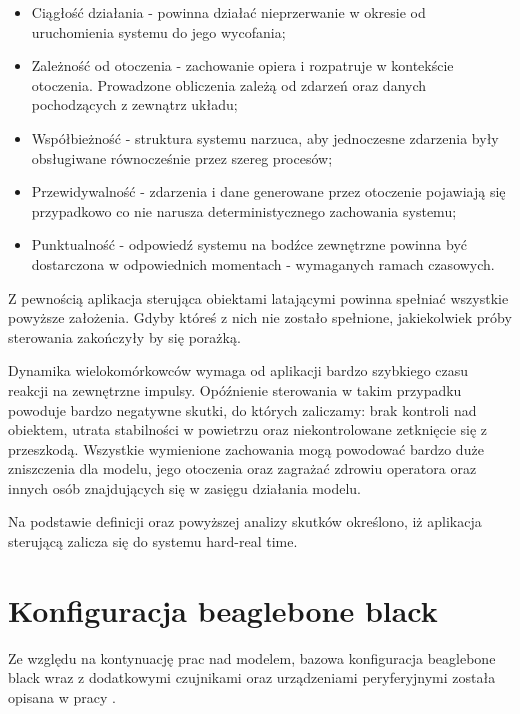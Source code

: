 \begin{itemize}
	\item Ciągłość działania - powinna działać nieprzerwanie w okresie od uruchomienia systemu do jego wycofania;
	
	\item Zależność od otoczenia - zachowanie opiera i rozpatruje w kontekście otoczenia. Prowadzone obliczenia zależą od zdarzeń oraz danych pochodzących z zewnątrz układu;
	
	\item Współbieżność - struktura systemu narzuca, aby jednoczesne zdarzenia były obsługiwane równocześnie przez szereg procesów;
	
	\item Przewidywalność - zdarzenia i dane generowane przez otoczenie pojawiają się przypadkowo co nie narusza deterministycznego zachowania systemu;
	
	\item Punktualność - odpowiedź systemu na bodźce zewnętrzne powinna być dostarczona w odpowiednich momentach - wymaganych ramach czasowych.
\end{itemize}

Z pewnością aplikacja sterująca obiektami latającymi powinna spełniać wszystkie powyższe założenia. Gdyby któreś z nich nie zostało spełnione, jakiekolwiek próby sterowania zakończyły by się porażką.

Dynamika wielokomórkowców wymaga od aplikacji bardzo szybkiego czasu reakcji na zewnętrzne impulsy. Opóźnienie sterowania w takim przypadku powoduje bardzo negatywne skutki, do których zaliczamy: brak kontroli nad obiektem, utrata stabilności w powietrzu oraz niekontrolowane zetknięcie się z przeszkodą. Wszystkie wymienione zachowania mogą powodować bardzo duże zniszczenia dla modelu, jego otoczenia oraz zagrażać zdrowiu operatora oraz innych osób znajdujących się w zasięgu działania modelu.

Na podstawie definicji oraz powyższej analizy skutków określono, iż aplikacja sterującą zalicza się do systemu hard-real time. 




\section{Konfiguracja beaglebone black}
Ze względu na kontynuację prac nad modelem, bazowa konfiguracja beaglebone black wraz z dodatkowymi czujnikami oraz urządzeniami peryferyjnymi została opisana w pracy \cite{inz}.

